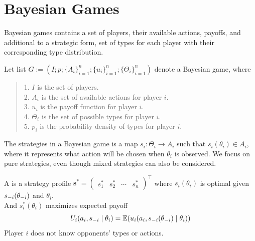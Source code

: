 \section{Bayesian Games}
Bayesian games contains a set of players, their available actions, payoffs, and additional to a strategic form, set of types for each player with their corresponding type distribution.
\begin{definition}
    Let list $G := (I; p; \{A_i\}_{i = 1}^n; \{u_i\}_{i = 1}^n; \{\Theta_i\}_{i = 1}^n)$ denote a Bayesian game, where
    \begin{quote}
        1. $I$ is the set of players. \\
        2. $A_i$ is the set of available actions for player $i$. \\
        3. $u_i$ is the payoff function for player $i$. \\
        4. $\Theta_i$ is the set of possible types for player $i$. \\
        5. $p_i$ is the probability density of types for player $i$.
    \end{quote}
\end{definition}
The strategies in a Bayesian game is a map $s_i: \Theta_i \to A_i$ such that $s_i(\theta_i) \in A_i$, where it represents what action will be chosen when $\theta_i$ is observed. We focus on pure strategies, even though mixed strategies can also be considered.
\begin{definition}
    A  is a strategy profile $\mathbf{s}^* = \begin{pmatrix}
        s_1^* & s_2^* & \cdots & s_n^*
    \end{pmatrix}^\top$ where $s_i(\theta_i)$ is optimal given $s_{-i}(\theta_{-i})$ and $\theta_i$. \\
    And $s_i^*(\theta_i)$ maximizes expected payoff
    $$U_i(a_i, s_{-i} \mid \theta_i) = \mathbb{E}(u_i(a_i, s_{-i}(\theta_{-i}) \mid \theta_i))$$
    Player $i$ does not know opponents' types or actions.
\end{definition}

